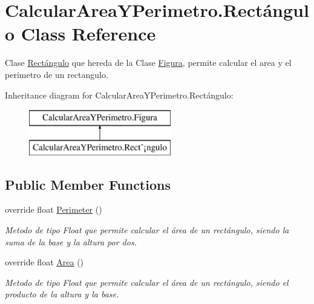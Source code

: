 \hypertarget{class_calcular_area_y_perimetro_1_1_rect_xC3_xA1ngulo}{}\section{Calcular\+Area\+Y\+Perimetro.\+Rectángulo Class Reference}
\label{class_calcular_area_y_perimetro_1_1_rect_xC3_xA1ngulo}


Clase \hyperlink{class_calcular_area_y_perimetro_1_1_rect_xC3_xA1ngulo}{Rectángulo} que hereda de la Clase \hyperlink{class_calcular_area_y_perimetro_1_1_figura}{Figura}, permite calcular el area y el perimetro de un rectangulo.  


Inheritance diagram for Calcular\+Area\+Y\+Perimetro.\+Rectángulo\+:\begin{figure}[H]
\begin{center}
\leavevmode
\includegraphics[height=2.000000cm]{class_calcular_area_y_perimetro_1_1_rect_xC3_xA1ngulo}
\end{center}
\end{figure}
\subsection*{Public Member Functions}
\begin{DoxyCompactItemize}
\item 
override float \hyperlink{class_calcular_area_y_perimetro_1_1_rect_xC3_xA1ngulo_ab88b945d80ab84beb97d5bf75d757bf2}{Perimeter} ()
\begin{DoxyCompactList}\small\item\em Metodo de tipo Float que permite calcular el área de un rectángulo, siendo la suma de la base y la altura por dos. \end{DoxyCompactList}\item 
override float \hyperlink{class_calcular_area_y_perimetro_1_1_rect_xC3_xA1ngulo_a4c223b8f95133eb0522b0986d982cc90}{Area} ()
\begin{DoxyCompactList}\small\item\em Metodo de tipo Float que permite calcular el área de un rectángulo, siendo el producto de la altura y la base. \end{DoxyCompactList}\end{DoxyCompactItemize}
